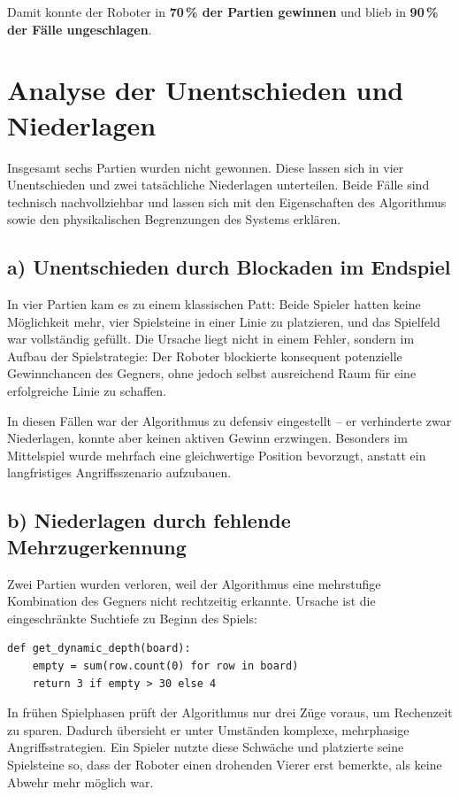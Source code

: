 Damit konnte der Roboter in \textbf{70\,\% der Partien gewinnen} und blieb in \textbf{90\,\% der Fälle ungeschlagen}.

\section{Analyse der Unentschieden und Niederlagen}

Insgesamt sechs Partien wurden nicht gewonnen. Diese lassen sich in vier Unentschieden und zwei tatsächliche Niederlagen unterteilen. Beide Fälle sind technisch nachvollziehbar und lassen sich mit den Eigenschaften des Algorithmus sowie den physikalischen Begrenzungen des Systems erklären.

\subsection*{a) Unentschieden durch Blockaden im Endspiel}

In vier Partien kam es zu einem klassischen Patt: Beide Spieler hatten keine Möglichkeit mehr, vier Spielsteine in einer Linie zu platzieren, und das Spielfeld war vollständig gefüllt. Die Ursache liegt nicht in einem Fehler, sondern im Aufbau der Spielstrategie: Der Roboter blockierte konsequent potenzielle Gewinnchancen des Gegners, ohne jedoch selbst ausreichend Raum für eine erfolgreiche Linie zu schaffen.

In diesen Fällen war der Algorithmus zu defensiv eingestellt – er verhinderte zwar Niederlagen, konnte aber keinen aktiven Gewinn erzwingen. Besonders im Mittelspiel wurde mehrfach eine gleichwertige Position bevorzugt, anstatt ein langfristiges Angriffsszenario aufzubauen.

\subsection*{b) Niederlagen durch fehlende Mehrzugerkennung}

Zwei Partien wurden verloren, weil der Algorithmus eine mehrstufige Kombination des Gegners nicht rechtzeitig erkannte. Ursache ist die eingeschränkte Suchtiefe zu Beginn des Spiels:

\begin{lstlisting}[style=pythonstyle]
	def get_dynamic_depth(board):
	empty = sum(row.count(0) for row in board)
	return 3 if empty > 30 else 4
\end{lstlisting}

In frühen Spielphasen prüft der Algorithmus nur drei Züge voraus, um Rechenzeit zu sparen. Dadurch übersieht er unter Umständen komplexe, mehrphasige Angriffsstrategien. Ein Spieler nutzte diese Schwäche und platzierte seine Spielsteine so, dass der Roboter einen drohenden Vierer erst bemerkte, als keine Abwehr mehr möglich war.

